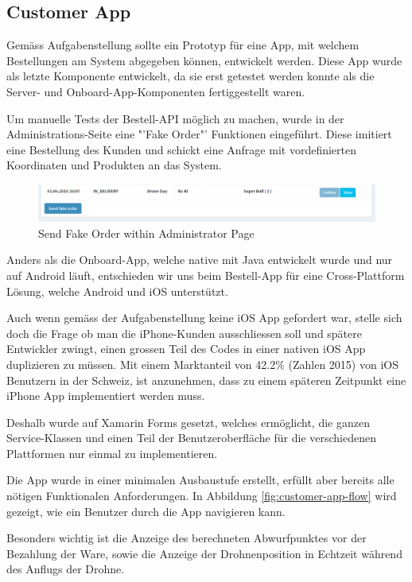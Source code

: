 \subsection{Customer App}
Gemäss Aufgabenstellung sollte ein Prototyp für eine App, mit welchem Bestellungen am System abgegeben können, entwickelt werden.
Diese App wurde als letzte Komponente entwickelt, da sie erst getestet werden konnte als die Server- und Onboard-App-Komponenten fertiggestellt waren.

Um manuelle Tests der Bestell-API möglich zu machen, wurde in der Administrations-Seite eine "'Fake Order"' Funktionen eingeführt. 
Diese imitiert eine Bestellung des Kunden und schickt eine Anfrage mit vordefinierten Koordinaten und Produkten an das System.

\begin{figure}[H]
	\centering
	\includegraphics[width=1\textwidth] {images/customer-app-fake-order.png}
	\caption{Send Fake Order within Administrator Page}
\end{figure}

Anders als die Onboard-App, welche native mit Java entwickelt wurde und nur auf Android läuft, entschieden wir uns beim Bestell-App für eine Cross-Plattform Lösung, welche Android und iOS unterstützt. 

Auch wenn gemäss der Aufgabenstellung keine iOS App gefordert war, stelle sich doch die Frage ob man die iPhone-Kunden ausschliessen soll und spätere Entwickler zwingt, einen grossen Teil des Codes in einer nativen iOS App duplizieren zu müssen. Mit einem Marktanteil von 42.2\% (Zahlen 2015) \cite{ios-user} von iOS Benutzern in der Schweiz, ist anzunehmen, dass zu einem späteren Zeitpunkt eine iPhone App implementiert werden muss.

Deshalb wurde auf Xamarin Forms gesetzt, welches ermöglicht, die ganzen Service-Klassen und einen Teil der Benutzeroberfläche für die verschiedenen Plattformen nur einmal zu implementieren.

Die App wurde in einer minimalen Ausbaustufe erstellt, erfüllt aber bereits alle nötigen Funktionalen Anforderungen. In Abbildung \ref{fig:customer-app-flow} wird gezeigt, wie ein Benutzer durch die App navigieren kann. 

Besonders wichtig ist die Anzeige des berechneten Abwurfpunktes vor der Bezahlung der Ware, sowie die Anzeige der Drohnenposition in Echtzeit während des Anflugs der Drohne.  

